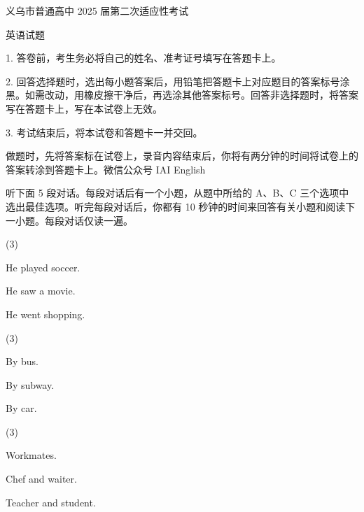 \documentclass{英语试卷}
\begin{document}
\par 义乌市普通高中 2025 届第二次适应性考试\par
\par 英语试题\par
\begin{notice}
\par 1. 答卷前，考生务必将自己的姓名、准考证号填写在答题卡上。\par
\par 2. 回答选择题时，选出每小题答案后，用铅笔把答题卡上对应题目的答案标号涂黑。如需改动，用橡皮擦干净后，再选涂其他答案标号。回答非选择题时，将答案写在答题卡上，写在本试卷上无效。\par
\par 3. 考试结束后，将本试卷和答题卡一并交回。\par
\end{notice}
\par 做题时，先将答案标在试卷上，录音内容结束后，你将有两分钟的时间将试卷上的答案转涂到答题卡上。微信公众号 IAI English\par
{}
\par 听下面 5 段对话。每段对话后有一个小题，从题中所给的 A、B、C 三个选项中选出最佳选项。听完每段对话后，你都有 10 秒钟的时间来回答有关小题和阅读下一小题。每段对话仅读一遍。\par
{}
\begin{choices}(3)
  \item He played soccer.
  \item He saw a movie.
  \item He went shopping.
\end{choices}
\begin{choices}(3)
  \item By bus.
  \item By subway.
  \item By car.
\end{choices}
\begin{choices}(3)
  \item Workmates.
  \item Chef and waiter.
  \item Teacher and student.
\end{choices}
\end{document}
